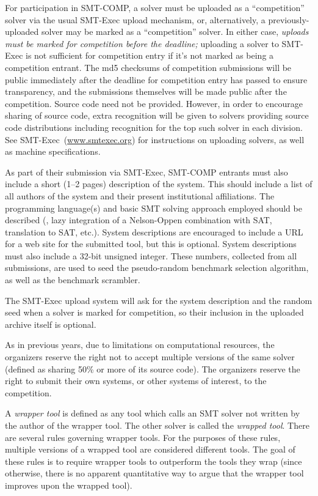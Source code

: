 \documentclass[12pt]{article}
\begin{document}
For participation in SMT-COMP, a solver must be
uploaded as a ``competition'' solver via the usual SMT-Exec upload
mechanism, or, alternatively, a previously-uploaded solver may be
marked as a ``competition'' solver.  In either case, \emph{uploads
must be marked for competition before the deadline;} uploading a solver
to SMT-Exec is not sufficient for competition entry if it's not marked
as being a competition entrant.  The md5 checksums of competition
submissions will be public immediately after the deadline for competition
entry has passed to ensure transparency, and the submissions themselves
will be made public after the competition.  Source code need not be
provided.  However, in order to encourage sharing of source code, extra
recognition will be given to solvers providing source code distributions
including recognition for the top such solver in each division.  See
SMT-Exec~(\url{www.smtexec.org}) for instructions on uploading solvers, as well
as machine specifications.

As part of their submission via SMT-Exec,
SMT-COMP entrants must also include a short (1--2 pages) description of
the system.  This should include a list of all authors of the system
and their present institutional affiliations.  The programming
language(s) and basic SMT solving approach employed should be
described (\eg, lazy integration of a Nelson-Oppen combination with
SAT, translation to SAT, etc.).  System descriptions are encouraged to
include a URL for a web site for the submitted tool, but this is
optional.  System descriptions must also include a 32-bit unsigned
integer.  These numbers, collected from all submissions, are used
to seed the pseudo-random benchmark selection algorithm, as well
as the benchmark scrambler.

The SMT-Exec upload system will ask for the system description and
the random seed when a solver is marked for competition, so
their inclusion in the uploaded archive itself is optional.

As in previous years, due to limitations on
computational resources, the organizers reserve the right not to
accept multiple versions of the same solver (defined as sharing 50\%
or more of its source code).  The organizers reserve the right to
submit their own systems, or other systems of interest, to the
competition.

A \emph{wrapper tool} is defined as any tool
which calls an SMT solver not written by the author of the wrapper
tool.  The other solver is called the \emph{wrapped tool}.  There are
several rules governing wrapper tools.  For the purposes of these rules,
multiple versions of a wrapped tool are considered different tools.
The goal of these rules is to require wrapper tools to outperform the
tools they wrap (since otherwise, there is no apparent quantitative 
way to argue that the wrapper tool improves upon the wrapped tool).
\end{document}

